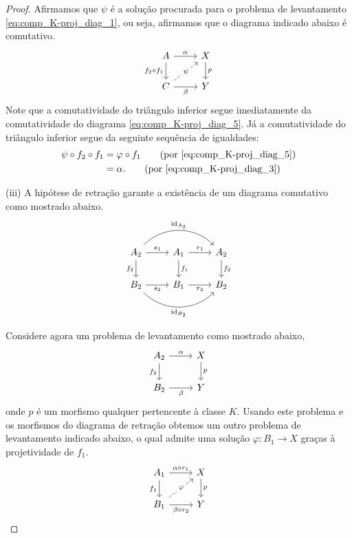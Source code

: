 \begin{proof}
  Afirmamos que $\psi$ é a solução procurada para o problema de levantamento \eqref{eq:comp_K-proj_diag_1}, ou seja, afirmamos que o diagrama indicado abaixo é comutativo.
  \begin{displaymath}
    \begin{tikzcd}
      A
      \arrow[r, "\alpha"]
      \arrow[d, "f_2 \circ f_1" swap]
      & X
      \arrow[d, "p"]
      \\ C
      \arrow[r, "\beta" swap]
      \arrow[ru, dashed, "\psi" description]
      & Y
    \end{tikzcd}
  \end{displaymath}
  Note que a comutatividade do triângulo inferior segue imediatamente da comutatividade do diagrama \eqref{eq:comp_K-proj_diag_5}.
  Já a comutatividade do triângulo inferior segue da seguinte sequência de igualdades:
  \begin{align*}
    \psi \circ f_2 \circ f_1
    & = \varphi \circ f_1
    \tag{por \eqref{eq:comp_K-proj_diag_5}} \\
    & = \alpha.
    \tag{por \eqref{eq:comp_K-proj_diag_3}}
  \end{align*}

  \smallskip
  (iii) A hipótese de retração garante a existência de um diagrama comutativo como mostrado abaixo.
  \begin{equation}\label{eq:retracao_K-proj_diag_1}
    \begin{tikzcd}
      A_2
      \arrow[r, "s_1"]
      \arrow[d, "f_2" swap]
      \arrow[rr, bend left=45, "\id_{A_2}"]
      & A_1
      \arrow[r, "r_1"]
      \arrow[d, "f_1"]
      & A_2
      \arrow[d, "f_2"]
      \\ B_2
      \arrow[r, "s_2" swap]
      \arrow[rr, bend right=45, "\id_{B_2}" swap]
      & B_1
      \arrow[r, "r_2" swap]
      & B_2
    \end{tikzcd}
  \end{equation}

  Considere agora um problema de levantamento como mostrado abaixo,
  \begin{displaymath}
    \begin{tikzcd}
      A_2
      \arrow[r, "\alpha"]
      \arrow[d, "f_2" swap]
      & X
      \arrow[d, "p"]
      \\ B_2
      \arrow[r, "\beta" swap]
      & Y
    \end{tikzcd}
  \end{displaymath}
  onde $p$ é um morfismo qualquer pertencente à classe $K$.
  Usando este problema e os morfismos do diagrama de retração obtemos um outro problema de levantamento indicado abaixo, o qual admite uma solução $\varphi: B_1 \to X$ graças à projetividade de $f_1$.
  \begin{equation}\label{eq:retracao_K-proj_diag_3}
    \begin{tikzcd}
      A_1
      \arrow[r, "\alpha \circ r_1"]
      \arrow[d, "f_1" swap]
      & X
      \arrow[d, "p"]
      \\ B_1
      \arrow[r, "\beta \circ r_2" swap]
      \arrow[ru, dashed, "\varphi" description]
      & Y
    \end{tikzcd}
  \end{equation}


\end{proof}
